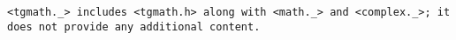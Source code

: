 \tt{<tgmath._>} includes \tt{<tgmath.h>} along with \tt{<math._>}
and \tt{<complex._>}; it does not provide any additional content.
